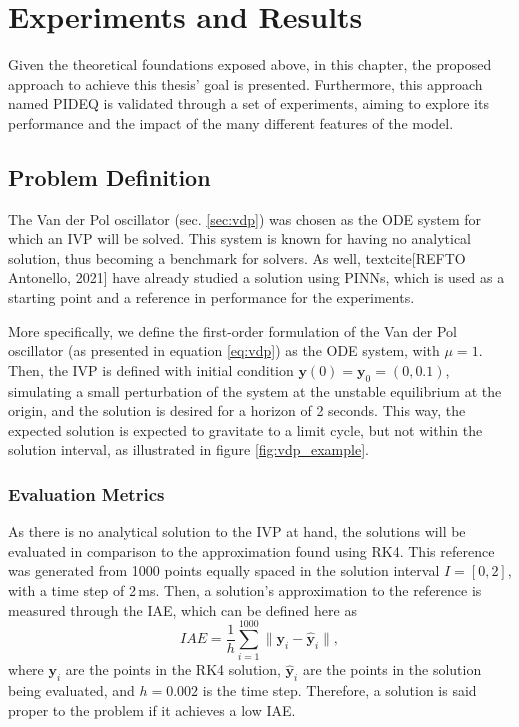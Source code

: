 \chapter{Experiments and Results}\label{ch:experiments}

Given the theoretical foundations exposed above, in this chapter, the proposed approach to achieve this thesis' goal is presented.
Furthermore, this approach named \gls{PIDEQ} is validated through a set of experiments, aiming to explore its performance and the impact of the many different features of the model.

\section{Problem Definition}

The Van der Pol oscillator (sec. \ref{sec:vdp}) was chosen as the \gls{ODE} system for which an \gls{IVP} will be solved.
This system is known for having no analytical solution, thus becoming a benchmark for solvers.
As well, textcite[REFTO Antonello, 2021] have already studied a solution using \gls{PINN}s, which is used as a starting point and a reference in performance for the experiments.

More specifically, we define the first-order formulation of the Van der Pol oscillator (as presented in equation \eqref{eq:vdp}) as the \gls{ODE} system, with $\mu=1$.
Then, the \gls{IVP} is defined with initial condition $\bm{y}(0) = \bm{y}_0 = \left( 0, 0.1 \right) $, simulating a small perturbation of the system at the unstable equilibrium at the origin, and the solution is desired for a horizon of 2 seconds. 
This way, the expected solution is expected to gravitate to a limit cycle, but not within the solution interval, as illustrated in figure \ref{fig:vdp_example}.

\subsection{Evaluation Metrics}

As there is no analytical solution to the \gls{IVP} at hand, the solutions will be evaluated in comparison to the approximation found using \gls{RK4}.
This reference was generated from 1000 points equally spaced in the solution interval $I=[0,2]$, with a time step of 2\,ms\footnotemark.
Then, a solution's approximation to the reference is measured through the \gls{IAE}, which can be defined here as \[
    IAE = \frac{1}{h}\sum_{i=1}^{1000} \|\bm{y}_i - \hat{\bm{y}}_i\|
,\] where $\bm{y}_i$ are the points in the \gls{RK4} solution,  $\hat{\bm{y}}_i$ are the points in the solution being evaluated, and $h=0.002$ is the time step.
Therefore, a solution is said proper to the problem if it achieves a low \gls{IAE}.


